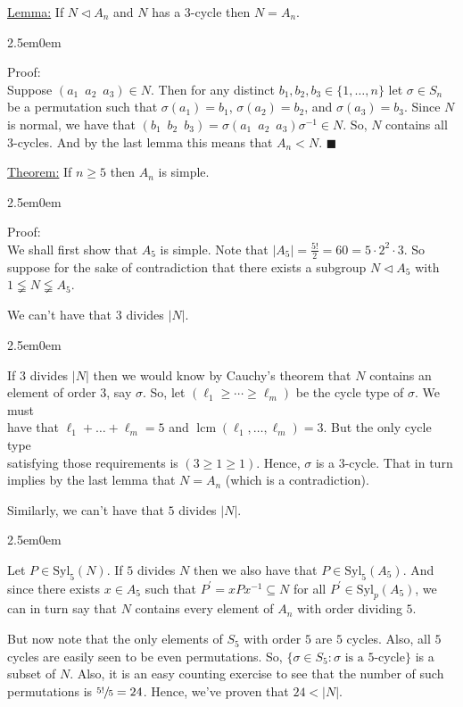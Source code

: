 \documentclass{book}
\newcommand{\exThreeP}{%
   \color{RedViolet}%
   \fontsize{12}{14}\selectfont%
}
\newcommand{\exPPP}{%
   \color{VioletRed}%
   \fontsize{12}{14}\selectfont%
}
\newenvironment{myIndent}{%
   \begin{adjustwidth}{2.5em}{0em}%
}{%
   \end{adjustwidth}%
}
\newcommand{\gap}{\phantom{2}}
\newcommand{\Syl}{\mathrm{Syl}}
\DeclareMathOperator{\lcm}{lcm}
\newcommand{\retTwo}{\hfill\bigbreak}
\begin{document}
\ul{Lemma:} If $N \lhd A_n$ and $N$ has a $3$-cycle then $N = A_n$.
\begin{myIndent}\exThreeP
	Proof:\\
	Suppose $(a_1\gap a_2 \gap a_3) \in N$. Then for any distinct $b_1, b_2, b_3 \in \{1, \ldots, n\}$ let $\sigma \in S_n$ be a permutation such that $\sigma(a_1) = b_1$, $\sigma(a_2) = b_2$, and $\sigma(a_3) = b_3$. Since $N$ is normal, we have that $(b_1\gap b_2 \gap b_3) = \sigma (a_1 \gap a_2 \gap a_3)\sigma^{-1} \in N$. So, $N$ contains all $3$-cycles. And by the last lemma this means that $A_n < N$. $\blacksquare$\retTwo
\end{myIndent}

\ul{Theorem:} If $n \geq 5$ then $A_n$ is simple.
\begin{myIndent}\exThreeP
	Proof:\\
	We shall first show that $A_5$ is simple. Note that $|A_5| = \frac{5!}{2} = 60 = 5 \cdot 2^2 \cdot 3$. So suppose for the sake of contradiction that there exists a subgroup $N \lhd A_5$ with $1 \lneqq N \lneqq A_5$.\retTwo

	We can't have that $3$ divides $|N|$.
	\begin{myIndent}\exPPP
		If $3$ divides $|N|$ then we would know by Cauchy's theorem that $N$ contains an\\ element of order $3$, say $\sigma$. So, let $(\ell_1 \geq \cdots \geq \ell_m)$ be the cycle type of $\sigma$. We must\\ have that $\ell_1 + \ldots + \ell_m = 5$ and $\lcm(\ell_1, \ldots, \ell_m) = 3$. But the only cycle type\\ satisfying those requirements is $(3 \geq 1 \geq 1)$. Hence, $\sigma$ is a $3$-cycle. That in turn\\ implies by the last lemma that $N = A_n$ (which is a contradiction).\retTwo
	\end{myIndent}

	Similarly, we can't have that $5$ divides $|N|$.\newpage
	\begin{myIndent}\exPPP
		Let $P \in \Syl_5(N)$. If $5$ divides $N$ then we also have that $P \in \Syl_5(A_5)$. And since there exists $x \in A_5$ such that $P^\prime = xPx^{-1} \subseteq N$ for all $P^\prime \in \Syl_p(A_5)$, we can in turn say that $N$ contains every element of $A_n$ with order dividing $5$.\retTwo

		But now note that the only elements of $S_5$ with order $5$ are $5$ cycles. Also, all $5$ cycles are easily seen to be even permutations. So, $\{\sigma \in S_5 : \sigma \text{ is a } 5\text{-cycle}\}$ is a subset of $N$. Also, it is an easy counting exercise to see that the number of such permutations is $\sfrac{5!}{5} = 24$. Hence, we've proven that $24 < |N|$.\retTwo


\end{myIndent}
\end{myIndent}
\end{document}
